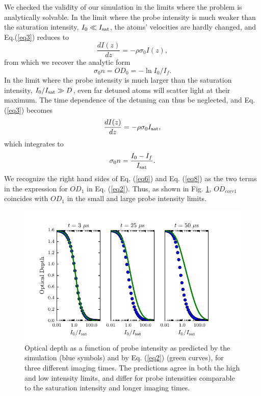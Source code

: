 \documentclass[12pt]{iopart}
\begin{document}
\par We checked the validity of our simulation in the limits where the problem is analytically solvable. In the limit where the probe intensity is much weaker than the saturation intensity, $I_0\ll I_{\rm{sat}}$, the atoms' velocities are hardly changed, and Eq.(\ref{eq3}) reduces to 
\begin{equation}
\frac{dI(z)}{dz}=-\rho\sigma_0 I(z),
\end{equation}
from which we recover the analytic form 
\begin{equation}
\sigma_0 n = OD_0 = -\ln I_0/I_f. \label{eq6}
\end{equation}
In the limit where the probe intensity is much larger than the saturation intensity, $I_0/I_{\rm{sat}}\gg D$, even far detuned atoms will scatter light at their maximum. The time dependence of the detuning can thus be neglected, and Eq. (\ref{eq3}) becomes 
\begin{equation}
\frac{dI(z)}{dz}=-\rho\sigma_0 I_{\rm{sat}}, 
\end{equation}
which integrates to 
\begin{equation}
\sigma_0 n = \frac{I_0 - I_f}{I_{\rm{sat}}}. \label{eq8}
\end{equation}
We recognize the right hand sides of Eq. (\ref{eq6}) and Eq. (\ref{eq8}) as the two terms in the expression for $OD_1$ in Eq. (\ref{eq2}). Thus, as shown in  Fig. \ref{fig:IsatLimits}, $OD_{corr1}$  coincides with $OD_1$ in the small and large probe intensity limits. 
\begin{figure}
	\includegraphics{figure3.pdf}
\caption{Optical depth as a function of probe intensity as predicted by the simulation (blue symbols) and by Eq. (\ref{eq2}) (green curves), for three different imaging times. The predictions agree in both the high and low intensity limits, and differ for probe intensities comparable to the saturation intensity and longer imaging times. }  
\label{fig:IsatLimits}
\end{figure}
\end{document}
